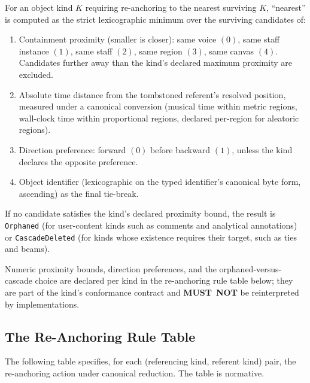 \documentclass[11pt,letterpaper]{report}
\newcounter{requirement}[chapter]
\newcommand{\MUSTNOT}{\textbf{MUST}\nobreak\ \textbf{NOT}}
\begin{document}
\begin{requirement}
  \label{req:semops:nearest-reanchor-order}
  For an object kind $K$ requiring re-anchoring to the nearest
  surviving $K$, ``nearest'' is computed as the strict lexicographic
  minimum over the surviving candidates of:

  \begin{enumerate}
    \item Containment proximity (smaller is closer): same voice
      $(0)$, same staff instance $(1)$, same staff $(2)$, same
      region $(3)$, same canvas $(4)$. Candidates further away than
      the kind's declared maximum proximity are excluded.
    \item Absolute time distance from the tombstoned referent's
      resolved position, measured under a canonical conversion
      (musical time within metric regions, wall-clock time within
      proportional regions, declared per-region for aleatoric
      regions).
    \item Direction preference: forward $(0)$ before backward $(1)$,
      unless the kind declares the opposite preference.
    \item Object identifier (lexicographic on the typed identifier's
      canonical byte form, ascending) as the final tie-break.
  \end{enumerate}

  If no candidate satisfies the kind's declared proximity bound, the
  result is \texttt{Orphaned} (for user-content kinds such as
  comments and analytical annotations) or \texttt{CascadeDeleted}
  (for kinds whose existence requires their target, such as ties
  and beams).

  Numeric proximity bounds, direction preferences, and the
  orphaned-versus-cascade choice are declared per kind in the
  re-anchoring rule table below; they are part of the kind's
  conformance contract and \MUSTNOT{} be reinterpreted by
  implementations.
\end{requirement}

\subsection{The Re-Anchoring Rule Table}

The following table specifies, for each (referencing kind, referent
kind) pair, the re-anchoring action under canonical reduction. The
table is normative.
\end{document}
